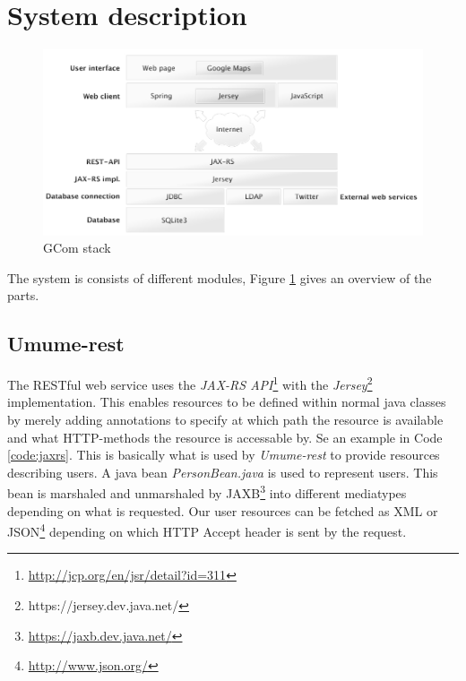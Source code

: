 \documentclass[titlepage, twocolumn, a4paper, 10pt]{article}
\begin{document}
\newpage
\section{System description}\label{sec:system}


\begin{figure}[!thb]
  \centerline{\includegraphics[width=160mm]{images/systemarchitecture.jpg}}
  \caption{GCom stack}
  \label{fig:images/sysarch}
\end{figure}

The system is consists of different modules, Figure \ref{fig:images/sysarch} gives an overview of the parts.

\subsection{Umume-rest}\label{sec:umume-rest}
The RESTful web service uses the \textit{JAX-RS API}\footnote{\url{http://jcp.org/en/jsr/detail?id=311}} with the \textit{Jersey}\footnote{https://jersey.dev.java.net/} implementation. This enables resources to be defined within normal java classes by merely adding annotations to specify at which path the resource is available and what HTTP-methods the resource is accessable by. Se an example in Code \ref{code:jaxrs}. This is basically what is used by \textit{Umume-rest} to provide resources describing users. A java bean \textit{PersonBean.java} is used to represent users. This bean is marshaled and unmarshaled by JAXB\footnote{\url{https://jaxb.dev.java.net/}} into different mediatypes depending on what is requested. Our user resources can be fetched as XML or JSON\footnote{\url{http://www.json.org/}} depending on which HTTP Accept header is sent by the request.
\end{document}
